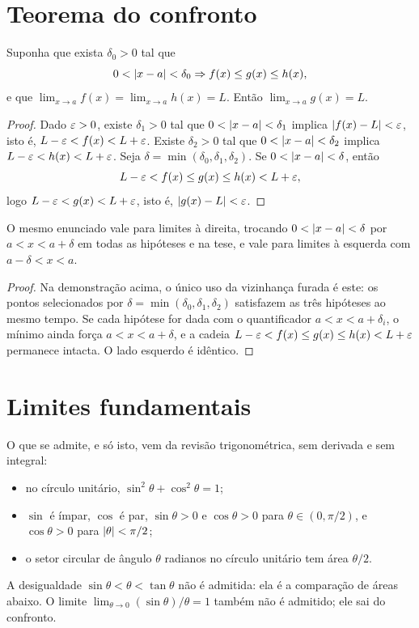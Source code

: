 \documentclass[11pt,a4paper]{article}
\begin{document}
\section{Teorema do confronto}
\label{sec:confronto}

\begin{teorema}
\label{teo:confronto}
Suponha que exista $\delta_0>0$ tal que
\[
0<\left\lvert x-a \right\rvert<\delta_0 \Rightarrow f(x)\le g(x)\le h(x),
\]
e que $\lim_{x\to a}f(x)=\lim_{x\to a}h(x)=L$. Ent\~ao $\lim_{x\to a}g(x)=L$.
\end{teorema}

\begin{proof}
Dado $\varepsilon>0$, existe $\delta_1>0$ tal que $0<\left\lvert x-a \right\rvert<\delta_1$ implica $\left\lvert f(x)-L \right\rvert<\varepsilon$, isto \'e, $L-\varepsilon<f(x)<L+\varepsilon$. Existe $\delta_2>0$ tal que $0<\left\lvert x-a \right\rvert<\delta_2$ implica $L-\varepsilon<h(x)<L+\varepsilon$. Seja $\delta=\min(\delta_0,\delta_1,\delta_2)$. Se $0<\left\lvert x-a \right\rvert<\delta$, ent\~ao
\[
L-\varepsilon<f(x)\le g(x)\le h(x)<L+\varepsilon,
\]
logo $L-\varepsilon<g(x)<L+\varepsilon$, isto \'e, $\left\lvert g(x)-L \right\rvert<\varepsilon$.
\end{proof}

\begin{corolario}
\label{cor:confronto-lateral}
O mesmo enunciado vale para limites \`a direita, trocando $0<\left\lvert x-a \right\rvert<\delta$ por $a<x<a+\delta$ em todas as hip\'oteses e na tese, e vale para limites \`a esquerda com $a-\delta<x<a$.
\end{corolario}

\begin{proof}
Na demonstra\c{c}\~ao acima, o \'unico uso da vizinhan\c{c}a furada \'e este: os pontos selecionados por $\delta=\min(\delta_0,\delta_1,\delta_2)$ satisfazem as tr\^es hip\'oteses ao mesmo tempo. Se cada hip\'otese for dada com o quantificador $a<x<a+\delta_i$, o m\'inimo ainda for\c{c}a $a<x<a+\delta$, e a cadeia $L-\varepsilon<f(x)\le g(x)\le h(x)<L+\varepsilon$ permanece intacta. O lado esquerdo \'e id\^entico.
\end{proof}

\section{Limites fundamentais}
\label{sec:fundamentais}

O que se admite, e s\'o isto, vem da revis\~ao trigonom\'etrica, sem derivada e sem integral:
\begin{itemize}
\item no c\'irculo unit\'ario, $\sin^2\theta+\cos^2\theta=1$;
\item $\sin$ \'e \'impar, $\cos$ \'e par, $\sin\theta>0$ e $\cos\theta>0$ para $\theta\in(0,\pi/2)$, e $\cos\theta>0$ para $\left\lvert \theta \right\rvert<\pi/2$;
\item o setor circular de \^angulo $\theta$ radianos no c\'irculo unit\'ario tem \'area $\theta/2$.
\end{itemize}
A desigualdade $\sin\theta<\theta<\tan\theta$ n\~ao \'e admitida: ela \'e a compara\c{c}\~ao de \'areas abaixo. O limite $\lim_{\theta\to 0}(\sin\theta)/\theta=1$ tamb\'em n\~ao \'e admitido; ele sai do confronto.
\end{document}
